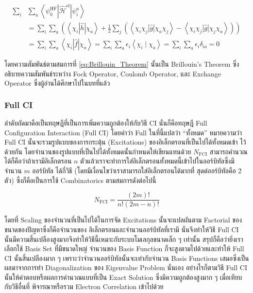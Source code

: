 \begin{equation}
    \label{eq:Brillouin_Theorem}
    \begin{aligned}
        \sum_i & \sum_a 
            \left\langle\psi_0^{\mathrm{HF}} 
            \left| \hat{\mathscr{H}}^{\mathrm{el}} \right| 
            \psi_i^a\right\rangle \\
        & = \sum_i \sum_a\left(\left\langle\chi_i|\hat{h}| \chi_a\right\rangle 
            + \frac{1}{2} \sum_j\left(\left\langle\chi_i \chi_j|\hat{g}| \chi_a \chi_j\right\rangle 
            - \left\langle\chi_i \chi_j|\hat{g}| \chi_j \chi_a\right\rangle\right)\right) \\
        & = \sum_i \sum_a\left\langle\chi_i|\hat{f}| \chi_a\right\rangle 
            = \sum_i \sum_a \epsilon_i\left\langle\chi_i \mid \chi_a\right\rangle 
            = \sum_i \sum_a \epsilon_i \delta_{i a} 
            = 0
    \end{aligned}
\end{equation}

\noindent โดยความสัมพันธ์ตามสมการที่ \ref{eq:Brillouin_Theorem} นั้นเป็น Brillouin's Theorem ซึ่งอธิบายความสัมพันธ์ระหว่าง 
Fock Operator, Coulomb Operator, และ Exchange Operator ซึ่งผู้อ่านได้ศึกษาไปในบทที่แล้ว

\subsubsection{Full CI}

ลำดับถัดมาคือเป็นทฤษฎีที่เป็นการเพิ่มความถูกต้องให้กับวิธี CI นั่นก็คือทฤษฎี Full Configuration Interaction (Full CI) โดยคำว่า Full 
ในที่นี้แปลว่า \enquote{ทั้งหมด} หมายความว่า Full CI นั้นจะรวมรูปแบบของการกระตุ้น (Excitations) ของอิเล็กตรอนที่เป็นไปได้ทั้งหมดเข้า%
ไว้ด้วยกัน โดยจำนวนของรูปแบบที่เป็นไปได้ทั้งหมดนั้นกำหนดให้เขียนแทนด้วย $N_{\mathrm{FCI}}$ สามารถคำนวณได้ก็คือว่าถ้าเรามีอิเล็กตรอน 
$n$ ตัวแล้วเราจะทำการใส่อิเล็กตรอนทั้งหมดนี้เข้าไปในออร์บิทัลซึ่งมีจำนวน $m$ ออร์บิทัล ได้กี่วิธี (โดยมีเงื่อนไขว่าเราสามารถใส่อิเล็กตรอนได้มากที่%
สุดต่ออร์บิทัลคือ 2 ตัว) ซึ่งก็คือเป็นการใช้ Combinatorics ตามสมการดังต่อไปนี้ 

\begin{equation}
    \label{eq:Full_CI}
    N_{\mathrm{FCI}} = \frac{(2 m) !}{n !(2 m-n) !}
\end{equation}

\noindent โดยที่ Scaling ของจำนวนที่เป็นไปได้ในการจัด Excitations นั้นจะแปลผันตาม Factorial ของขนาดของปัญหาซึ่งก็คือจำนวนของ%
อิเล็กตรอนและจำนวนออร์บิทัลที่เรามี นั่นจึงทำให้วิธี Full CI นั้นมีความสิ้นเปลืองสูงมากจึงทำให้วิธีนี้เหมาะกับระบบโมเลกุลขนาดเล็ก ๆ เท่านั้น 
สรุปก็คือว่ายิ่งเราเลือกใช้ Basis Set ที่มีขนาดใหญ่ จำนวนของ Basis Function ก็จะสูงตามไปด้วยและทำให้ Full CI นั้นสิ้นเปลืองมาก ๆ 
เพราะว่าจำนวนออร์บิทัลนั้นจะเท่ากับจำนวน Basis Functions เสมอซึ่งเป็นผลมาจากการทำ Diagonalization ของ Eigenvalue Problem 
นั่นเอง อย่างไรก็ตามวิธี Full CI นั้นให้คำตอบหรือผลการคำนวณแบบที่เป็น Exact Solution ซึ่งมีความถูกต้องสูงมาก ๆ เมื่อเทียบกับวิธีอื่นที่%
พิจารณาหรือรวม Electron Correlation เข้าไปด้วย

